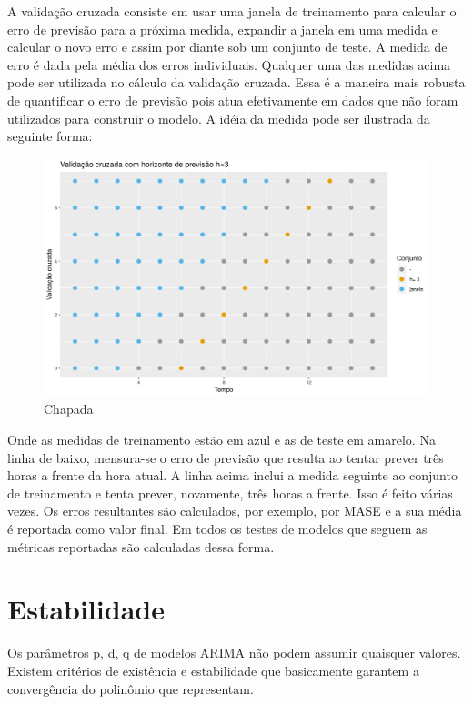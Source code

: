 \documentclass[
	12pt,				%
	openright,			%
	oneside,			%
	a4paper,			%
	english,			%
	french,				%
	spanish,			%
	brazil				%
	]{abntex2}
\begin{document}
A validação cruzada consiste em usar uma janela de treinamento para calcular o erro de previsão para a próxima medida, expandir a janela em uma medida e calcular o novo erro e assim por diante sob um conjunto de teste. A medida de erro é dada pela média dos erros individuais. Qualquer uma das medidas acima pode ser utilizada no cálculo da validação cruzada. Essa é a maneira mais robusta de quantificar o erro de previsão pois atua efetivamente em dados que não foram utilizados para construir o modelo. A idéia da medida pode ser ilustrada da seguinte forma:

\begin{figure}[h]
    \centering
	\includegraphics[width=\textwidth]{crossh3}
	\caption{Chapada}
\end{figure}
\FloatBarrier

Onde as medidas de treinamento estão em azul e as de teste em amarelo. Na linha de baixo, mensura-se o erro de previsão que resulta ao tentar prever três horas a frente da hora atual. A linha acima inclui a medida seguinte ao conjunto de treinamento e tenta prever, novamente, três horas a frente. Isso é feito várias vezes. Os erros resultantes são calculados, por exemplo, por MASE e a sua média é reportada como valor final. Em todos os testes de modelos que seguem as métricas reportadas são calculadas dessa forma.

\section{Estabilidade}

Os parâmetros p, d, q de modelos ARIMA não podem assumir quaisquer valores. Existem critérios de existência e estabilidade que basicamente garantem a convergência do polinômio que representam.
\end{document}
